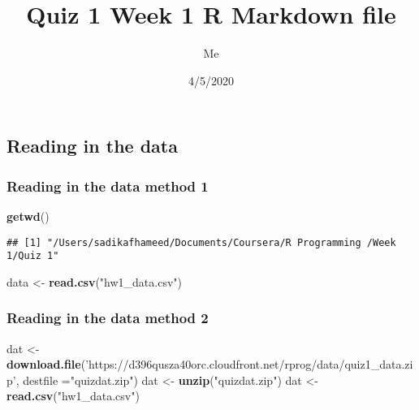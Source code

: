 \documentclass[]{article}
\title{Quiz 1 Week 1 R Markdown file}
\author{Me}
\date{4/5/2020}
\newenvironment{Shaded}{\begin{snugshade}}{\end{snugshade}}
\newcommand{\DataTypeTok}[1]{\textcolor[rgb]{0.13,0.29,0.53}{#1}}
\newcommand{\KeywordTok}[1]{\textcolor[rgb]{0.13,0.29,0.53}{\textbf{#1}}}
\newcommand{\NormalTok}[1]{#1}
\newcommand{\StringTok}[1]{\textcolor[rgb]{0.31,0.60,0.02}{#1}}
\begin{document}
\maketitle

\hypertarget{reading-in-the-data}{%
\subsection{Reading in the data}\label{reading-in-the-data}}

\hypertarget{reading-in-the-data-method-1}{%
\subsubsection{Reading in the data method
1}\label{reading-in-the-data-method-1}}

\begin{Shaded}
\begin{Highlighting}[]
\KeywordTok{getwd}\NormalTok{()}
\end{Highlighting}
\end{Shaded}

\begin{verbatim}
## [1] "/Users/sadikafhameed/Documents/Coursera/R Programming /Week 1/Quiz 1"
\end{verbatim}

\begin{Shaded}
\begin{Highlighting}[]
\NormalTok{data <-}\StringTok{ }\KeywordTok{read.csv}\NormalTok{(}\StringTok{"hw1_data.csv"}\NormalTok{)}
\end{Highlighting}
\end{Shaded}

\hypertarget{reading-in-the-data-method-2}{%
\subsubsection{Reading in the data method
2}\label{reading-in-the-data-method-2}}

\begin{Shaded}
\begin{Highlighting}[]
\NormalTok{dat <-}\StringTok{ }\KeywordTok{download.file}\NormalTok{(}\StringTok{'https://d396qusza40orc.cloudfront.net/rprog/data/quiz1_data.zip'}\NormalTok{, }\DataTypeTok{destfile =}\StringTok{"quizdat.zip"}\NormalTok{)}
\NormalTok{dat <-}\StringTok{ }\KeywordTok{unzip}\NormalTok{(}\StringTok{"quizdat.zip"}\NormalTok{)}
\NormalTok{dat <-}\StringTok{ }\KeywordTok{read.csv}\NormalTok{(}\StringTok{"hw1_data.csv"}\NormalTok{)}
\end{Highlighting}
\end{Shaded}
\end{document}
